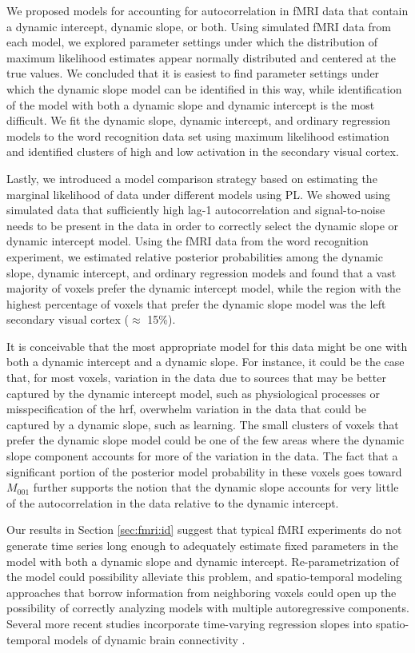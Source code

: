 We proposed models for accounting for autocorrelation in fMRI data that contain a dynamic intercept, dynamic slope, or both. Using simulated fMRI data from each model, we explored parameter settings under which the distribution of maximum likelihood estimates appear normally distributed and centered at the true values. We concluded that it is easiest to find parameter settings under which the dynamic slope model can be identified in this way, while identification of the model with both a dynamic slope and dynamic intercept is the most difficult. We fit the dynamic slope, dynamic intercept, and ordinary regression models to the word recognition data set using maximum likelihood estimation and identified clusters of high and low activation in the secondary visual cortex.

Lastly, we introduced a model comparison strategy based on estimating the marginal likelihood of data under different models using PL. We showed using simulated data that sufficiently high lag-1 autocorrelation and signal-to-noise needs to be present in the data in order to correctly select the dynamic slope or dynamic intercept model. Using the fMRI data from the word recognition experiment, we estimated relative posterior probabilities among the dynamic slope, dynamic intercept, and ordinary regression models and found that a vast majority of voxels prefer the dynamic intercept model, while the region with the highest percentage of voxels that prefer the dynamic slope model was the left secondary visual cortex ($\approx$ 15\%).

It is conceivable that the most appropriate model for this data might be one with both a dynamic intercept and a dynamic slope. For instance, it could be the case that, for most voxels, variation in the data due to sources that may be better captured by the dynamic intercept model, such as physiological processes or misspecification of the hrf, overwhelm variation in the data that could be captured by a dynamic slope, such as learning. The small clusters of voxels that prefer the dynamic slope model could be one of the few areas where the dynamic slope component accounts for more of the variation in the data. The fact that a significant portion of the posterior model probability in these voxels goes toward $M_{001}$ further supports the notion that the dynamic slope accounts for very little of the autocorrelation in the data relative to the dynamic intercept.

Our results in Section \ref{sec:fmri:id} suggest that typical fMRI experiments do not generate time series long enough to adequately estimate fixed parameters in the model with both a dynamic slope and dynamic intercept. Re-parametrization of the model could possibility alleviate this problem, and spatio-temporal modeling approaches that borrow information from neighboring voxels could open up the possibility of correctly analyzing models with multiple autoregressive components. Several more recent studies incorporate time-varying regression slopes into spatio-temporal models of dynamic brain connectivity \citep{ho:ombao:2005:statespace,bhatt:matira:aoas:2011}.


